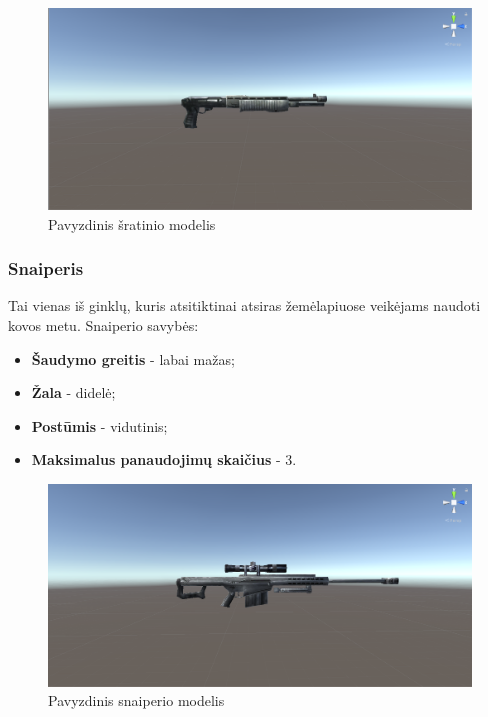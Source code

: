 \documentclass{VUMIFPSkursinis}
\begin{document}
\begin{figure}[H]
    \centering
    \includegraphics[scale=0.3]{img/Weapons/Shotgun.png}
    \caption{Pavyzdinis šratinio modelis}
    \label{img:shotgun}
\end{figure}

\subsubsection{Snaiperis}
Tai vienas iš ginklų, kuris atsitiktinai atsiras žemėlapiuose veikėjams naudoti kovos metu. Snaiperio savybės:
\begin{itemize}
    \item \textbf{Šaudymo greitis} - labai mažas;
    \item \textbf{Žala} - didelė;
    \item \textbf{Postūmis} - vidutinis;
    \item \textbf{Maksimalus panaudojimų skaičius} - 3.
\end{itemize}

\begin{figure}[H]
    \centering
    \includegraphics[scale=0.3]{img/Weapons/Sniper.png}
    \caption{Pavyzdinis snaiperio modelis}
    \label{img:sniper}
\end{figure}
\end{document}
